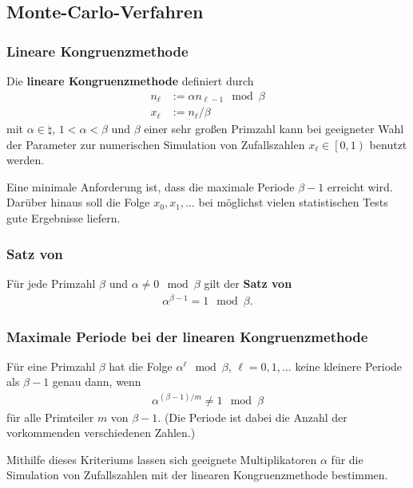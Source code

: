 \subsection{%
    Monte-Carlo-Verfahren%
}

\subsubsection{%
    Lineare Kongruenzmethode%
}

Die \textbf{lineare Kongruenzmethode} definiert durch
\begin{align*}
    n_\ell & := \alpha n_{\ell-1} \mod \beta \\
    x_\ell & := n_\ell / \beta
\end{align*}
mit $\alpha \in \natural$, $1 < \alpha < \beta$ und $\beta$
einer sehr großen Primzahl kann bei geeigneter Wahl der Parameter zur
numerischen Simulation von Zufallszahlen $x_\ell \in \left[0, 1\right)$
benutzt werden.

Eine minimale Anforderung ist, dass die maximale Periode $\beta - 1$ erreicht
wird.
Darüber hinaus soll die Folge $x_0, x_1, \dotsc$ bei möglichst vielen
statistischen Tests gute Ergebnisse liefern.

\subsubsection{%
    Satz von %
}

Für jede Primzahl $\beta$ und $\alpha \not= 0 \mod \beta$ gilt
der \textbf{Satz von }
\begin{align*}
    \alpha^{\beta-1} = 1 \mod \beta.
\end{align*}

\subsubsection{%
    Maximale Periode bei der linearen Kongruenzmethode%
}

Für eine Primzahl $\beta$ hat die Folge $\alpha^\ell \mod \beta$,
$\ell = 0, 1, \dotsc$ keine kleinere Periode als $\beta - 1$ genau dann, wenn
\begin{align*}
    \alpha^{(\beta-1)/m} \not= 1 \mod \beta
\end{align*}
für alle Primteiler $m$ von $\beta - 1$.
(Die Periode ist dabei die Anzahl der vorkommenden verschiedenen Zahlen.)

Mithilfe dieses Kriteriums lassen sich geeignete Multiplikatoren $\alpha$
für die Simulation von Zufallszahlen mit der linearen Kongruenzmethode
bestimmen.


